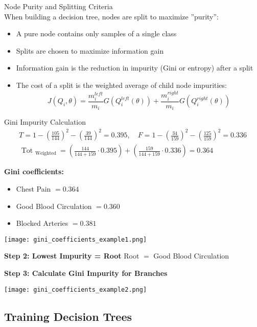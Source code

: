 \begin{concept}{Node Purity and Splitting Criteria}\\
When building a decision tree, nodes are split to maximize ''purity'':
\begin{itemize}
    \item A pure node contains only samples of a single class
    \item Splits are chosen to maximize information gain
    \item Information gain is the reduction in impurity (Gini or entropy) after a split
    \item The cost of a split is the weighted average of child node impurities:
    \[J(Q_i, \theta) = \frac{m^{left}_i}{m_i}G(Q^{left}_i(\theta)) + \frac{m^{right}_i}{m_i}G(Q^{right}_i(\theta))\]
\end{itemize}
\end{concept}

\begin{example2}{Gini Impurity Calculation}
    $$
\begin{gathered}
T=1-\left(\frac{105}{144}\right)^2-\left(\frac{39}{144}\right)^2=0.395, \quad F=1-\left(\frac{34}{159}\right)^2-\left(\frac{125}{159}\right)^2=0.336 \\
\text { Tot }_{\text {Weighted }}=\left(\frac{144}{144+159} \cdot 0.395\right)+\left(\frac{159}{144+159} \cdot 0.336\right)=0.364
\end{gathered}
$$

\textbf{Gini coefficients:}
\begin{itemize}
    \item Chest Pain $=0.364$
    \item Good Blood Circulation $=0.360$
    \item Blocked Arteries $=0.381$
\end{itemize}
\texttt{[image: gini\_coefficients\_example1.png]}

\textbf{Step 2: Lowest Impurity = Root}
Root $=$ Good Blood Circulation

\textbf{Step 3: Calculate Gini Impurity for Branches}

\texttt{[image: gini\_coefficients\_example2.png]}
    
\end{example2}


\subsection{Training Decision Trees}

